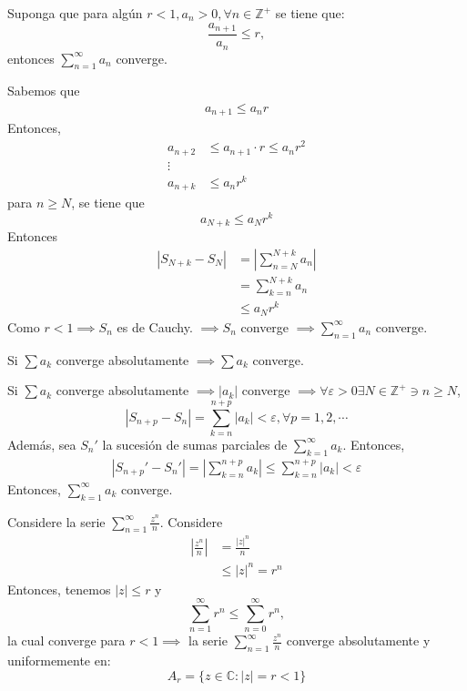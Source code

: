 \begin{prop}
    Suponga que para algún $r<1,a_n>0,\forall n\in \mathbb{Z}^+$ se tiene que:
    $$\frac{a_{n+1}}{a_n}\leq r,$$
    entonces $\sum_{n=1}^{\infty}a_n$ converge. 
    \begin{dem}
        Sabemos que 
        \begin{align*}
            a_{n+1}\leq a_n r
        \end{align*}
        Entonces,
        \begin{align*}
            a_{n+2}&\leq a_{n+1}\cdot r\leq a_n r^2\\
            \vdots &\\
            a_{n+k}&\leq a_nr^k
        \end{align*}
        para $n\geq N$, se tiene que 
        $$a_{N+k}\leq a_N r^k$$
        Entonces
        \begin{align*}
            |S_{N+k}-S_N| &= \left| \sum_{n=N}^{N+k}a_n\right|\\
            &= \sum_{k=n}^{N+k}a_n\\
            &\leq a_Nr^k 
        \end{align*}
        Como $r<1\implies S_n$ es de Cauchy. $\implies S_n$ converge $\implies \sum_{n=1}^{\infty}a_n$ converge. 
    \end{dem}
\end{prop}

\begin{teorema}
    Si $\sum a_k$ converge absolutamente $\implies \sum a_k$ converge. 
    \begin{dem}
        Si $\sum a_k$ converge absolutamente $\implies |a_k|$ converge $\implies \forall \varepsilon>0\exists N\in \mathbb{Z}^+\ni n\geq N$,
        $$|S_{n+p}-S_n|=\sum_{k=n}^{n+p}|a_k|<\varepsilon,\forall p=1,2,\cdots$$
        Además, sea $S_n'$ la sucesión de sumas parciales de $\sum_{k=1}^\infty a_k$. Entonces, 
        \begin{align*}
            \left| S_{n+p}' -S_n'\right| = \left|\sum_{k=n}^{n+p} a_k\right| \leq \sum_{k=n}^{n+p}|a_k|<\varepsilon
        \end{align*}
        Entonces, $\sum_{k=1}^\infty a_k$ converge.
    \end{dem}
\end{teorema}



\begin{ejemplo}
    Considere la serie $\sum_{n=1}^{\infty}\frac{z^n}{n}$. 
    Considere 
    \begin{align*}
        \left|\frac{z^n}{n}\right| &=\frac{|z|^n}{n}\\
        &\leq |z|^n =r^n
    \end{align*}
    Entonces, tenemos $|z|\leq r$ y 
    $$\sum_{n=1}^{\infty} r^n \leq \sum_{n=0}^{\infty} r^n,$$
    la cual converge para $r<1\implies$ la serie $\sum_{n=1}^{\infty}\frac{z^n}{n}$ converge absolutamente y uniformemente en: 
    $$A_r=\{z\in \mathbb{C}: |z|=r<1\}$$ 
\end{ejemplo}